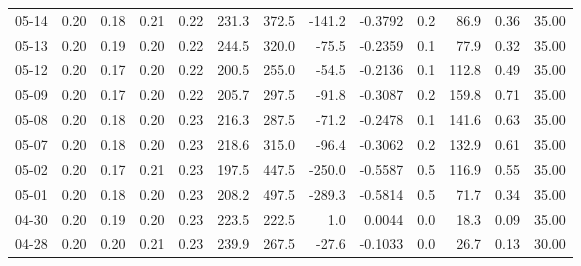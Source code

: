 \begin{threeparttable}
{\begin{tabular}{lrrrrrrrrrrrr}
  05-14 &          0.20 &          0.18 &          0.21 &        0.22 &               231.3 &               372.5 &     -141.2 &      -0.3792 &                 0.2 &             86.9 &            0.36 &                  35.00 \\
  05-13 &          0.20 &          0.19 &          0.20 &        0.22 &               244.5 &               320.0 &      -75.5 &      -0.2359 &                 0.1 &             77.9 &            0.32 &                  35.00 \\
  05-12 &          0.20 &          0.17 &          0.20 &        0.22 &               200.5 &               255.0 &      -54.5 &      -0.2136 &                 0.1 &            112.8 &            0.49 &                  35.00 \\
  05-09 &          0.20 &          0.17 &          0.20 &        0.22 &               205.7 &               297.5 &      -91.8 &      -0.3087 &                 0.2 &            159.8 &            0.71 &                  35.00 \\
  05-08 &          0.20 &          0.18 &          0.20 &        0.23 &               216.3 &               287.5 &      -71.2 &      -0.2478 &                 0.1 &            141.6 &            0.63 &                  35.00 \\
  05-07 &          0.20 &          0.18 &          0.20 &        0.23 &               218.6 &               315.0 &      -96.4 &      -0.3062 &                 0.2 &            132.9 &            0.61 &                  35.00 \\
  05-02 &          0.20 &          0.17 &          0.21 &        0.23 &               197.5 &               447.5 &     -250.0 &      -0.5587 &                 0.5 &            116.9 &            0.55 &                  35.00 \\
  05-01 &          0.20 &          0.18 &          0.20 &        0.23 &               208.2 &               497.5 &     -289.3 &      -0.5814 &                 0.5 &             71.7 &            0.34 &                  35.00 \\
  04-30 &          0.20 &          0.19 &          0.20 &        0.23 &               223.5 &               222.5 &        1.0 &       0.0044 &                 0.0 &             18.3 &            0.09 &                  35.00 \\
  04-28 &          0.20 &          0.20 &          0.21 &        0.23 &               239.9 &               267.5 &      -27.6 &      -0.1033 &                 0.0 &             26.7 &            0.13 &                  30.00 \\

\end{tabular}}
\end{threeparttable}
